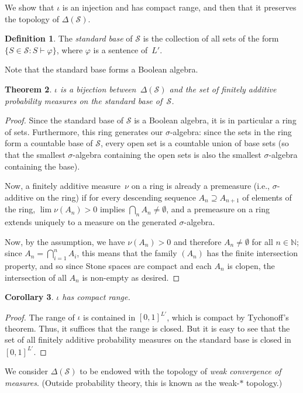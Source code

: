 \documentclass[12pt]{article}
\newcommand{\vp}{\varphi}
\newcommand{\cL}{L'}
\newcommand{\cS}{\mathcal{S}}
\theoremstyle{plain}
\newtheorem{theorem}{Theorem}[subsection]
\newtheorem{corollary}[theorem]{Corollary}
\theoremstyle{definition}
\newtheorem{definition}[theorem]{Definition}
\theoremstyle{remark}
\begin{document}
We show that $\iota$ is an injection and has compact range, and then that it preserves the topology of $\Delta(\cS)$.
\begin{definition}
The \emph{standard base} of $\cS$ is the collection of all sets of the form $\{S\in\cS : S\vdash\vp\}$, where $\vp$ is a sentence of~$\cL$.
\end{definition}
Note that the standard base forms a Boolean algebra.
\begin{theorem}
$\iota$ is a bijection between~$\Delta(\cS)$ and the set of finitely additive probability measures on the standard base of~$\cS$.
\end{theorem}
\begin{proof}
Since the standard base of $\cS$ is a Boolean algebra, it is in particular a ring of sets. Furthermore, this ring generates our $\sigma$-algebra: since the sets in the ring form a countable base of $\cS$, every open set is a countable union of base sets (so that the smallest $\sigma$-algebra containing the open sets is also the smallest $\sigma$-algebra containing the base).

Now, a finitely additive measure~$\nu$ on a ring is already a premeasure (i.e., $\sigma$-additive on the ring) if for every descending sequence $A_n\supseteq A_{n+1}$ of elements of the ring, $\lim \nu(A_n) > 0$ implies $\textstyle\bigcap_n A_n \neq\emptyset$, and a premeasure on a ring extends uniquely to a measure on the generated $\sigma$-algebra. 

Now, by the assumption, we have $\nu(A_n) > 0$ and therefore $A_n\neq\emptyset$ for all $n\in\mathbb{N}$; since $\textstyle A_n = \bigcap_{i=1}^n A_i$, this means that the family $(A_n)$ has the finite intersection property, and so since Stone spaces are compact and each $A_n$ is clopen, the intersection of all $A_n$ is non-empty as desired.
\end{proof}
\begin{corollary}
$\iota$ has compact range.
\end{corollary}
\begin{proof}
The range of $\iota$ is contained in $[0,1]^{L'}$, which is compact by Tychonoff's theorem. Thus, it suffices that the range is closed. But it is easy to see that the set of all finitely additive probability measures on the standard base is closed in $[0,1]^{L'}$.
\end{proof}
We consider $\Delta(\cS)$ to be endowed with the topology of \emph{weak convergence of measures}. (Outside probability theory, this is known as the weak-$*$ topology.)
\end{document}
